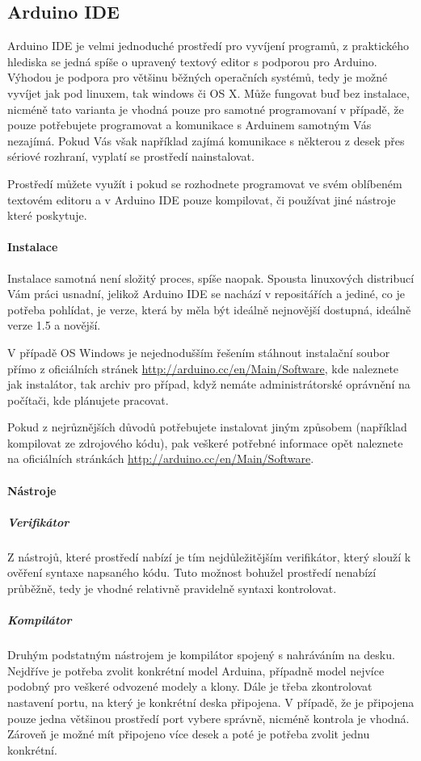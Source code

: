 \documentclass[12pt,titlepage]{article}
\begin{document}
	\subsection{Arduino IDE}
	Arduino IDE je velmi jednoduché prostředí pro vyvíjení programů, z praktického hlediska se jedná spíše o upravený textový editor s podporou pro Arduino.
	Výhodou je podpora pro většinu běžných operačních systémů, tedy je možné vyvíjet jak pod linuxem, tak windows či OS X. Může fungovat buď bez instalace, nicméně tato varianta je vhodná pouze pro samotné programovaní v případě, že pouze potřebujete programovat a komunikace s Arduinem samotným Vás nezajímá. Pokud Vás však například zajímá komunikace s některou z desek přes sériové rozhraní, vyplatí se prostředí nainstalovat.

	Prostředí můžete využít i pokud se rozhodnete programovat ve svém oblíbeném textovém editoru a v Arduino IDE pouze kompilovat, či používat jiné nástroje které poskytuje.
		\paragraph{Instalace}
			Instalace samotná není složitý proces, spíše naopak. Spousta linuxových distribucí Vám práci usnadní, jelikož Arduino IDE se nachází v repositářích a jediné, co je potřeba pohlídat, je verze, která by měla být ideálně nejnovější dostupná, ideálně verze 1.5 a novější.

			V případě OS Windows je nejednodušším řešením stáhnout instalační soubor přímo z oficiálních stránek \url{http://arduino.cc/en/Main/Software}, kde naleznete jak instalátor, tak archiv pro případ, když nemáte administrátorské oprávnění na počítači, kde plánujete pracovat.

			Pokud z nejrůznějších důvodů potřebujete instalovat jiným způsobem (například kompilovat ze zdrojového kódu), pak veškeré potřebné informace opět naleznete na oficiálních stránkách \url{http://arduino.cc/en/Main/Software}.
		\paragraph{Nástroje}

		\subparagraph{Verifikátor}
			Z nástrojů, které prostředí nabízí je tím nejdůležitějším verifikátor, který slouží k ověření syntaxe napsaného kódu. Tuto možnost bohužel prostředí nenabízí průběžně, tedy je vhodné relativně pravidelně syntaxi kontrolovat.

		\subparagraph{Kompilátor }
			Druhým podstatným nástrojem je kompilátor spojený s nahráváním na desku. Nejdříve je potřeba zvolit konkrétní model Arduina, případně model nejvíce podobný pro veškeré odvozené modely a klony.  Dále je třeba zkontrolovat nastavení portu, na který je konkrétní deska připojena. V případě, že je připojena pouze jedna většinou prostředí port vybere správně, nicméně kontrola je vhodná. Zároveň je možné mít připojeno více desek a poté je potřeba zvolit jednu konkrétní.
\end{document}
